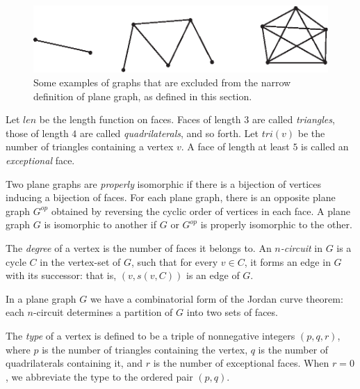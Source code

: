     \begin{figure}[htb]
        \centering
        \includegraphics{PS/nonplanar.eps}
        \caption{Some examples of graphs that are excluded from the
        narrow definition of plane graph, as defined in this section.}
        \label{fig:nonplanar}
    \end{figure}

\begin{definition}
Let $len$ be the length function on faces.  Faces of length $3$
are called {\it triangles}, those of length $4$ are called {\it
quadrilaterals}, and so forth. Let $tri(v)$ be the number of
triangles containing a vertex $v$. A face of length at least $5$
is called an {\it exceptional\/} face.
\end{definition}

Two plane graphs are {\it properly} isomorphic if there is a
bijection of vertices inducing a bijection of faces.  For each
plane graph, there is an opposite plane graph $G^{op}$ obtained by
reversing the cyclic order of vertices in each face.  A plane
graph $G$ is  isomorphic to another if $G$ or $G^{op}$ is properly
isomorphic to the other.
%

\begin{definition}
The {\it degree\/} of a vertex is the number of faces it belongs
to. An {\it $n$-circuit\/} in $G$ is a cycle $C$ in the vertex-set
of $G$, such that for every $v\in C$, it forms an edge in $G$ with
its successor: that is, $(v,s(v,C))$ is an edge of $G$.
%
\end{definition}

In a plane graph $G$ we have a combinatorial form of the Jordan
curve theorem: each $n$-circuit determines a partition of $G$ into
two sets of faces.

\begin{definition}\label{definition:type}
The {\it type\/} of a vertex is defined to be a triple of
nonnegative integers $(p,q,r)$, where $p$ is the number of triangles
containing the vertex, $q$ is the number of quadrilaterals
containing it, and $r$ is the number of exceptional faces. When
$r=0$, we abbreviate the type to the ordered pair $(p,q)$.
%
\end{definition}


